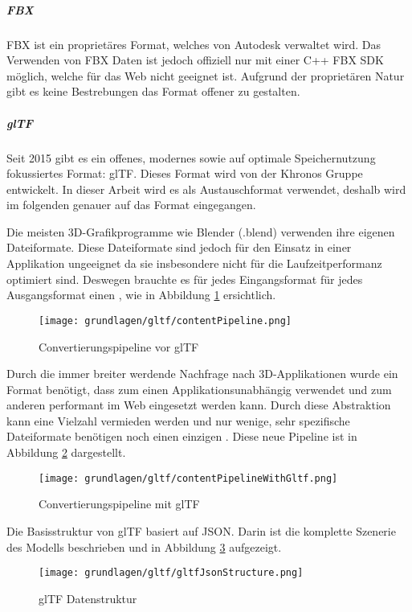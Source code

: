 \subparagraph{FBX}
FBX ist ein proprietäres Format, welches von Autodesk verwaltet wird. Das Verwenden von FBX Daten ist jedoch offiziell nur mit einer C++ FBX SDK möglich, welche für das Web nicht geeignet ist. Aufgrund der proprietären Natur gibt es keine Bestrebungen das Format offener zu gestalten.

\subparagraph{glTF}
Seit 2015 gibt es ein offenes, modernes sowie auf optimale Speichernutzung fokussiertes Format: glTF. Dieses Format wird von der Khronos Gruppe entwickelt. \cite{gltf1Spec} In dieser Arbeit wird es als Austauschformat verwendet, deshalb wird im folgenden genauer auf das Format eingegangen.

Die meisten 3D-Grafikprogramme wie Blender (.blend) verwenden ihre eigenen Dateiformate. Diese Dateiformate sind jedoch für den Einsatz in einer Applikation ungeeignet da sie insbesondere nicht für die Laufzeitperformanz optimiert sind. Deswegen brauchte es für jedes Eingangsformat für jedes Ausgangsformat einen , wie in Abbildung \ref{fig:contentPipelineWithoutGltf} ersichtlich.

\begin{figure}[H]
  \centering
  \texttt{[image: grundlagen/gltf/contentPipeline.png]}
  \caption{Convertierungspipeline vor glTF \cite{gltf1Spec}}
  \label{fig:contentPipelineWithoutGltf}
\end{figure}

Durch die immer breiter werdende Nachfrage nach 3D-Applikationen wurde ein Format benötigt, dass zum einen Applikationsunabhängig verwendet und zum anderen performant im Web eingesetzt werden kann. \cite{gltf1Spec}
Durch diese Abstraktion kann eine Vielzahl  vermieden werden und nur wenige, sehr spezifische Dateiformate benötigen noch einen einzigen . Diese neue Pipeline ist in Abbildung \ref{fig:contentPipelineWithGltf} dargestellt. \cite{gltf1Spec}
\begin{figure}[H]
  \centering
  \texttt{[image: grundlagen/gltf/contentPipelineWithGltf.png]}
  \caption{Convertierungspipeline mit glTF \cite{gltf1Spec}}
  \label{fig:contentPipelineWithGltf}
\end{figure}

Die Basisstruktur von glTF basiert auf JSON. Darin ist die komplette Szenerie des Modells beschrieben und in Abbildung \ref{fig:gltfDatastructure} aufgezeigt.\cite{gltf1Spec}
\begin{figure}[H]
  \centering
  \texttt{[image: grundlagen/gltf/gltfJsonStructure.png]}
  \caption{glTF Datenstruktur \cite{gltf1Spec}}
  \label{fig:gltfDatastructure}
\end{figure}

